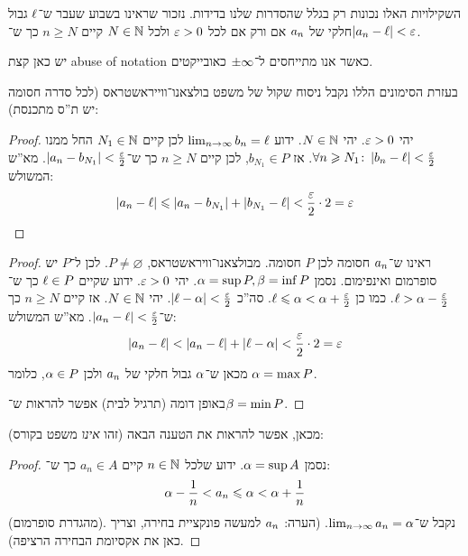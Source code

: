 \documentclass[name=רשימות חשבון דיפרנציאלי ואינטגרלי 1א]{../../../tex/classes/megasumPreamble}
\begin{document}
	השקילויות האלו נכונות רק בגלל שהסדרות שלנו בדידות. נזכור שראינו בשבוע שעבר ש־$\ell$ גבול חלקי של $a_n$ אם ורק אם לכל $\eg > 0$ ולכל $N \in \mathbb{N}$ קיים $n \ge N$ כך ש־$\sof{a_n - \ml} < \eg$.

	יש כאן קצת abuse of notation כאשר אנו מתייחסים ל־$\pm \infty$ כאובייקטים.

	בעזרת הסימונים הללו נקבל ניסוח שקול של משפט בולצאנו־ווייראשטראס (לכל סדרה חסומה יש ת''ס מתכנסת):


	\begin{proof}
		יהי $\eg > 0$. יהי $N \in \mathbb{N}$. ידוע $\lim_{n \to \infty} b_n = \ell$ לכן קיים $N_1 \in \mathbb{N}$ החל ממנו $\forall n \ge N_1 \co \sof{b_n - \ml} < \frac{\eg}{2}$. אז $b_{N_1} \in P$, לכן קיים $n \ge N$ כך ש־$\sof{a_n - b_{N_1}} < \frac{\eg}{2}$. מא''ש המשולש:
		\[ \sof{a_n - \ml} \le \sof{a_n - b_{N_1}} + \sof{b_{N_1} - \ml} < \frac{\eg}{2} \cdot 2 = \eg \]
	\end{proof}

	\begin{proof}
		ראינו ש־$a_n$ חסומה לכן $P$ חסומה. מבולצאנו־וויראשטראס, $P \neq \varnothing$. לכן ל־$P$ יש סופרמום ואינפימום. נסמן $\alpha = \sup P, \beta = \inf P$. יהי $\eg > 0$. ידוע שקיים $\ell \in P$ כך ש־$\ml > \ag - \frac{\eg}{2}$. כמו כן $\ml \le \ag < \ag + \frac{\eg}{2}$. סה''כ $\sof{\ml - \ag} < \frac{\eg}{2}$. יהי $N \in \mathbb{N}$. אז קיים $n \ge N$ כך ש־$\sof{a_n - \ml} < \frac{\eg}{2}$. מא''ש המשולש:
		\[ \sof{a_n - \ml} < \sof{a_n - \ml} + \sof{\ml - \ag} < \frac{\eg}{2} \cdot 2 = \eg \]
		מכאן ש־$\alpha$ גבול חלקי של $a_n$ ולכן $\alpha \in P$, כלומר $\alpha = \max P$.

		באופן דומה (תרגיל לבית) אפשר להראות ש־$\beta = \min P$.
	\end{proof}

	מכאן, אפשר להראות את הטענה הבאה (זהו \textit{אינו} משפט בקורס):
	\begin{proof}
		נסמן $\alpha = \sup A$. ידוע שלכל $n \in \mathbb{N}$ קיים $a_n \in A$ כך ש־:
		\[ \alpha - \frac{1}{n} < a_n \leqslant \alpha < \alpha + \frac{1}{n} \]
		(מהגדרת סופרמום). נקבל ש־$\lim_{n \to \infty} a_n = \alpha$. (הערה: $a_n$ למעשה פונקציית בחירה, וצריך כאן את אקסיומת הבחירה הרציפה).
	\end{proof}
\end{document}
